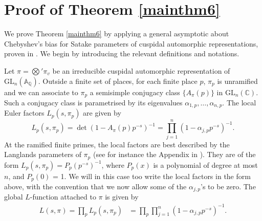 \documentclass[12pt,reqno]{amsart}
\theoremstyle{definition}
\numberwithin{equation}{section}
\newcommand{\GL}{\mathrm{GL}}
\begin{document}
\section{Proof of Theorem \ref{mainthm6} } \label{2}

We prove Theorem \ref{mainthm6} by applying a general asymptotic about Chebyshev's bias for Satake parameters of cuspidal automorphic representations, proven in \cite[Theorem 4.1]{Sheth24B}. We begin by introducing the relevant definitions and notations. 

\label{Section2}
Let $\pi=\bigotimes'\pi_v$ be an irreducible cuspidal automorphic representation of $\GL_n(\mathbb A_\mathbb Q)$.  Outside a finite set of places, for each finite place $p$, $\pi_p$ is unramified and we can associate to $\pi_p$ a semisimple conjugacy class $\{A_\pi(p)\}$ in $\GL_n(\mathbb C)$. Such a conjugacy class is parametrised by its eigenvalues $\alpha_{1, p}, \ldots, \alpha_{n, p}$. The local Euler factors $L_p(s, \pi_p)$ are given by 
$$
L_p(s, \pi_p)=\det(1-A_\pi(p) p^{-s})^{-1}= \prod_{j=1}^n (1-\alpha_{j, p}p^{-s})^{-1}. 
$$
At the ramified finite primes, the local factors are best described by the Langlands parameters of $\pi_p$ (see for instance the Appendix in \cite{SarnakRudnick1996}). They are of the form $L_p(s, \pi_p) = P_p(p^{-s})^{-1}$, where $P_p(x)$ is a polynomial of degree at most $n$, and $P_p(0)$ = 1. We will in this case too write the local factors in the form above, with the convention that we now allow some of the $\alpha_{j, p}$'s to be zero. The global $L$-function attached to $\pi$ is given by
\begin{align*}
L(s, \pi)= \prod_p L_p(s, \pi_p) &=\prod_p  \prod_{j=1}^n (1-\alpha_{j, p} p^{-s})^{-1}. 
\end{align*}
\end{document}
